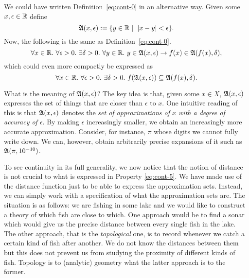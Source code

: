 We could have written Definition~\ref{eq:cont-0} in an alternative way. Given some
$x, \epsilon \in \mathbb{R}{}$ define
\begin{equation*}
  \mathfrak{A}(x, \epsilon) := \{ y \in \mathbb{R}{}~\|~| x - y | < \epsilon \}.
\end{equation*}
Now, the following is the same as Definition~\ref{eq:cont-0}.
\begin{equation*}
  \forall x \in \mathbb{R}{}.~ \forall \epsilon > 0.~ \exists \delta > 0.~ \forall y \in \mathbb{R}{}.~
    y \in \mathfrak{A}(x, \epsilon) \rightarrow f(x) \in \mathfrak{A}(f(x), \delta),
\end{equation*}
which could even more compactly be expressed as
\begin{equation*}\label{eq:cont-5}
  \forall x \in \mathbb{R}{}.~ \forall \epsilon > 0.~ \exists \delta > 0.~ f(\mathfrak{A}(x, \epsilon)) \subseteq \mathfrak{A}(f(x), \delta).
\end{equation*}

What is the meaning of $\mathfrak{A}(x, \epsilon)$? The key idea is that, given some $x \in X$,
$\mathfrak{A}(x, \epsilon)$ expresses the set of things that are closer than $\epsilon$ to $x$. One intuitive
reading of this is that $\mathfrak{A}(x, \epsilon)$ denotes the \emph{set of approximations of $x$ with
a degree of accuracy of $\epsilon$}. By making $\epsilon$ increasingly smaller, we obtain an
increasingly more accurate approximation. Consider, for instance, $\pi$ whose digits we
cannot fully write down. We can, however, obtain arbitrarily precise expansions of it such
as $\mathfrak{A}(\pi, 10^{-10})$.

To see continuity in its full generality, we now notice that the notion of distance is not
crucial to what is expressed in Property \ref{eq:cont-5}. We have made use of the distance
function just to be able to express the approximation sets. Instead, we can simply work
with a specification of what the approximation sets are. The situation is as follows: we
are fishing in some lake and we would like to construct a theory of which fish are close
to which. One approach would be to find a sonar which would give us the precise distance
between every single fish in the lake. The other approach, that is the \emph{topological}
one, is to record whenever we catch a certain kind of fish after another. We do not know
the distances between them but this does not prevent us from studying the proximity of
different kinds of fish. Topology is to (analytic) geometry what the latter approach is to
the former.

